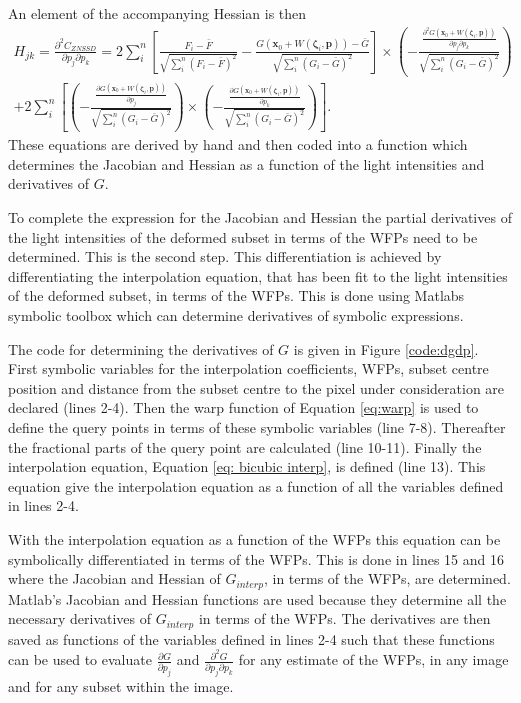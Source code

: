 \documentclass[12pt,oneside,openany,a4paper, %
english, %
masters-t, goldenblock]{usthesis}
\newcommand*\mean[1]{\bar{#1}} %
\begin{document}
An element of the accompanying Hessian is then
\begin{multline}
\label{eq: hessian hand}
  H_{jk}=\frac{\partial^2 C_{ZNSSD}}{\partial p_j \partial p_k} = 2 \sum_i^n \left[ \frac{F_i-\mean{F}}{\sqrt{\sum_i^n (F_i-\mean{F})^2}} - \frac{G(\bm{x}_0 + W(\bm{\zeta}_i, \bm{p}))-\mean{G}}{\sqrt{\sum_i^n (G_i-\mean{G})^2}} \right] \times \left( -\frac{\frac{\partial^2 G(\bm{x}_0 + W(\bm{\zeta}_i, \bm{p}))}{\partial p_j \partial p_k}}{\sqrt{\sum_i^n (G_i-\mean{G})^2}} \right) \\ + 2 \sum_i^n \left[ \left( - \frac{\frac{\partial G(\bm{x}_0 + W(\bm{\zeta}_i, \bm{p}))}{\partial p_j}}{\sqrt{\sum_i^n (G_i-\mean{G})^2}} \right) \times \left( - \frac{\frac{\partial G(\bm{x}_0 + W(\bm{\zeta}_i, \bm{p}))}{\partial p_k}}{\sqrt{\sum_i^n (G_i-\mean{G})^2}} \right) \right].
\end{multline}
These equations are derived by hand and then coded into a function which determines the Jacobian and Hessian as a function of the light intensities and derivatives of $G$.

To complete the expression for the Jacobian and Hessian the partial derivatives of the light intensities of the deformed subset in terms of the WFPs need to be determined. This is the second step. This differentiation is achieved by differentiating the interpolation equation, that has been fit to the light intensities of the deformed subset, in terms of the WFPs. This is done using Matlabs symbolic toolbox which can determine derivatives of symbolic expressions. 

The code for determining the derivatives of $G$ is given in Figure \ref{code:dgdp}. First symbolic variables for the interpolation coefficients, WFPs, subset centre position and distance from the subset centre to the pixel under consideration are declared (lines 2-4). Then the warp function of Equation \ref{eq:warp} is used to define the query points in terms of these symbolic variables (line 7-8). Thereafter the fractional parts of the query point are calculated (line 10-11). Finally the interpolation equation, Equation \ref{eq: bicubic interp}, is defined (line 13). This equation give the interpolation equation as a function of all the variables defined in lines 2-4. 

With the interpolation equation as a function of the WFPs this equation can be symbolically differentiated in terms of the WFPs. This is done in lines 15 and 16 where the Jacobian and Hessian of $G_{interp}$, in terms of the WFPs, are determined. Matlab's Jacobian and Hessian functions are used because they determine all the necessary derivatives of $G_{interp}$ in terms of the WFPs. The derivatives are then saved as functions of the variables defined in lines 2-4 such that these functions can be used to evaluate $\frac{\partial G}{\partial p_j}$ and $\frac{\partial^2 G}{\partial p_j \partial p_k}$ for any estimate of the WFPs, in any image and for any subset within the image.
\end{document}
